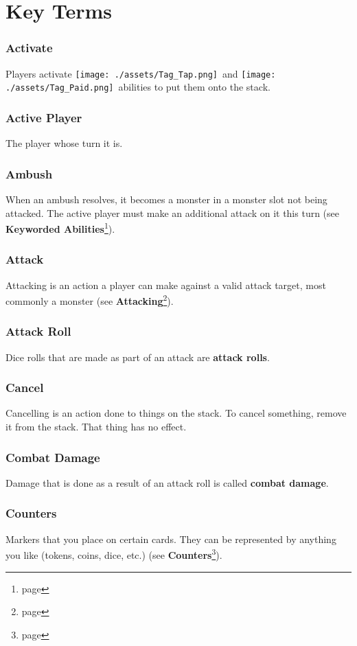 \documentclass[10pt, a4paper, twoside]{article} %
\newcommand{\tap}{\texttt{[image: ./assets/Tag\_Tap.png]}}
\newcommand{\pay}{\texttt{[image: ./assets/Tag\_Paid.png]}}
\begin{document}
    \section{Key Terms}
    \subsubsection*{Activate}
    Players activate \tap\ and \pay\ abilities to put them onto the stack.
    \subsubsection*{Active Player}
    The player whose turn it is.
    \subsubsection*{Ambush}
    When an ambush resolves, it becomes a monster in a monster slot not being attacked. The active player must make an additional attack on it this turn (see \textbf{Keyworded Abilities}\footnote{page \pageref{keyworded}}).
    \subsubsection*{Attack}
    Attacking is an action a player can make against a valid attack target, most commonly a monster (see \textbf{Attacking}\footnote{page \pageref{attacking}}).
    \subsubsection*{Attack Roll}
    Dice rolls that are made as part of an attack are \textbf{attack rolls}.
    \subsubsection*{Cancel}
    Cancelling is an action done to things on the stack. To cancel something, remove it from the stack. That thing has no effect.
    \subsubsection*{Combat Damage}
    Damage that is done as a result of an attack roll is called \textbf{combat damage}.
    \subsubsection*{Counters}
    Markers that you place on certain cards. They can be represented by anything you like (tokens, coins, dice, etc.) (see \textbf{Counters}\footnote{page \pageref{counters}}).
\end{document}
